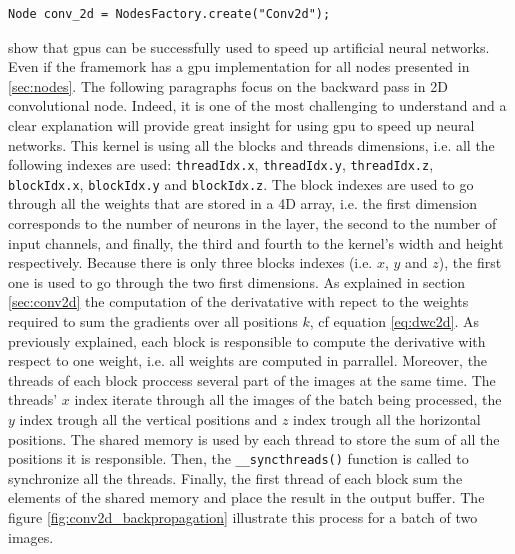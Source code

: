 \documentclass[11pt]{report}
\begin{document}
\begin{verbatim}
Node conv_2d = NodesFactory.create("Conv2d");
\end{verbatim}

\noindent \textcite{DBLP:journals/tjs/BritoFCSWMF16} show that \acrshort{gpu}s can be successfully used to speed up artificial neural networks. Even if the framemork has a \acrshort{gpu} implementation for all nodes presented in \ref{sec:nodes}. The following paragraphs focus on the backward pass in 2D convolutional node. Indeed, it is one of the most challenging to understand and a clear explanation will provide great insight for using \acrshort{gpu} to speed up neural networks. This kernel is using all the blocks and threads dimensions, i.e. all the following indexes are used: \texttt{threadIdx.x}, \texttt{threadIdx.y}, \texttt{threadIdx.z}, \texttt{blockIdx.x}, \texttt{blockIdx.y} and \texttt{blockIdx.z}. The block indexes are used to go through all the weights that are stored in a 4D array, i.e. the first dimension corresponds to the number of neurons in the layer, the second to the number of input channels, and finally, the third and fourth to the kernel's width and height respectively. Because there is only three blocks indexes (i.e. $x$, $y$ and $z$), the first one is used to go through the two first dimensions. As explained in section \ref{sec:conv2d} the computation of the derivatative with repect to the weights required to sum the gradients over all positions $k$, cf equation \ref{eq:dwc2d}. As previously explained, each block is responsible to compute the derivative with respect to one weight, i.e. all weights are computed in parrallel. Moreover, the threads of each block proccess several part of the images at the same time. The threads' $x$ index iterate through all the images of the batch being processed, the $y$ index trough all the vertical positions and $z$ index trough all the horizontal positions. The shared memory is used by each thread to store the sum of all the positions it is responsible. Then, the \texttt{__syncthreads()} function is called to synchronize all the threads. Finally, the first thread of each block sum the elements of the shared memory and place the result in the output buffer. The figure \ref{fig:conv2d_backpropagation} illustrate this process for a batch of two images.
\end{document}
